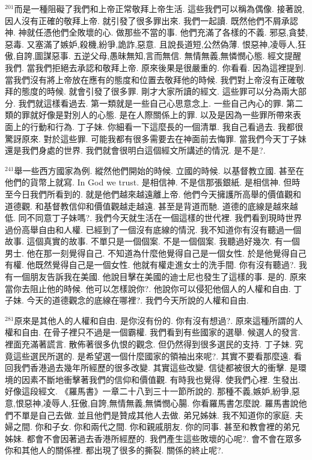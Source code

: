\documentclass{book}
\begin{document}
$^{201}$而是一種阻礙了我們和上帝正常敬拜上帝生活.
這些我們可以稱為偶像.
接著說,因人沒有正確的敬拜上帝.
就引發了很多罪出來.
我們一起讀.
既然他們不屑承認神.
神就任憑他們全敗壞的心.
做那些不當的事.
他們充滿了各樣的不義.
邪惡,貪婪,惡毒.
又塞滿了嫉妒,殺機,紛爭,詭詐,惡意.
且說長道短,公然偽薄.
恨惡神,凌辱人,狂傲,自誇,圖謀惡事.
五逆父母,愚昧無知,言而無信.
無情無義,無憐憫心態.
經文提醒我們.
當我們拒絕去承認和敬拜上帝.
原來後果是很嚴重的.
你看看.
因為這裡提到.
當我們沒有將上帝放在應有的態度和位置去敬拜他的時候.
我們對上帝沒有正確敬拜的態度的時候.
就會引發了很多罪.
剛才大家所讀的經文.
這些罪可以分為兩大部分.
我們就這樣看過去.
第一類就是一些自己心思意念上.
一些自己內心的罪.
第二類的罪就好像是對別人的心態.
是在人際關係上的罪.
以及是因為一些罪所帶來表面上的行動和行為.
丁子妹.
你細看一下這麼長的一個清單.
我自己看過去.
我都很驚訝原來.
對於這些罪.
可能我都有很多需要去在神面前去悔罪.
當我們今天丁子妹還是我們身處的世界.
我們就會很明白這個經文所講述的情況.
是不是?.

$^{241}$舉一些西方國家為例.
縱然他們開始的時候.
立國的時候.
以基督教立國.
甚至在他們的貨幣上就寫.
In God we trust.
是相信神.
不是信那張銀紙.
是相信神.
但時至今日我們所看到的.
就是他們越來越遠離上帝.
他們今天擁護所高舉的價值觀和道德觀.
和基督教信仰和價值觀越走越遠.
甚至是背道而馳.
道德的底線是越來越低.
同不同意丁子妹嗎?.
我們今天就生活在一個這樣的世代裡.
我們看到現時世界過份高舉自由和人權.
已經到了一個沒有底線的情況.
我不知道你有沒有聽過一個故事.
這個真實的故事.
不單只是一個個案.
不是一個個案.
我聽過好幾次.
有一個男士.
他在那一刻覺得自己.
不知道為什麼他覺得自己是一個女性.
於是他覺得自己有權.
他既然覺得自己是一個女性.
他就有權走進女士的洗手間.
你有沒有聽過?.
我有一個朋友告訴我在美國.
他說目擊在美國的迪士尼也發生了這樣的事.
是的.
原來當你去阻止他的時候.
他可以怎樣說你?.
他說你可以侵犯他個人的人權和自由.
丁子妹.
今天的道德觀念的底線在哪裡?.
我們今天所說的人權和自由.

$^{281}$原來是其他人的人權和自由.
是你沒有份的.
你有沒有想過?.
原來這種所謂的人權和自由.
在骨子裡只不過是一個霸權.
我們看到有些國家的選舉.
候選人的發言.
裡面充滿著謊言.
散佈著很多仇恨的觀念.
但仍然得到很多選民的支持.
丁子妹.
究竟這些選民所選的.
是希望選一個什麼國家的領袖出來呢?.
其實不要看那麼遠.
看回我們香港過去幾年所經歷的很多改變.
其實這些改變.
信徒都被很大的衝擊.
是環境的因素不斷地衝擊著我們的信仰和價值觀.
有時我也覺得.
使我們心裡.
生發出.
好像這段經文.
《羅馬書》一章二十八到三十一節所說的.
那種不義,嫉妒,紛爭,惡意,恨惡神,凌辱人,狂傲,自誇,無情無義,無憐憫心腸.
你看羅馬書怎麼說.
羅馬書說他們不單是自己去做.
並且他們是贊成其他人去做.
弟兄姊妹.
我不知道你的家庭.
夫婦之間.
你和子女.
你和兩代之間.
你和親戚朋友.
你的同事.
甚至和教會裡的弟兄姊妹.
都會不會因著過去香港所經歷的.
我們產生這些敗壞的心呢?.
會不會在眾多你和其他人的關係裡.
都出現了很多的撕裂.
關係的終止呢?.
\end{document}
